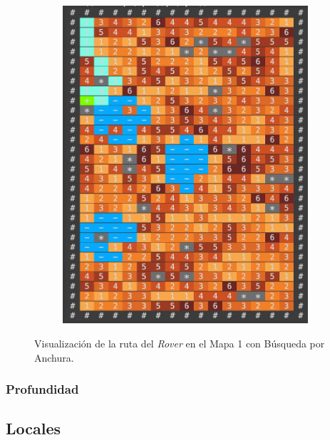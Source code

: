 \documentclass[12pt, letterpaper]{article}
\begin{document}
            \begin{figure}[h!]
                \centering
                \begin{subfigure}[h!]{0.45\textwidth}
                    \centering
                    \includegraphics[scale=0.2,angle=0]{anchuram1g.jpeg}
                \end{subfigure}
                \hfill
                \centering
                \caption{Visualización de la ruta del \textit{Rover} en el Mapa 1 con Búsqueda por Anchura.}\label{an_m1_g}
            \end{figure}

        \subsubsection{Profundidad}

    \subsection{Locales}
\end{document}
